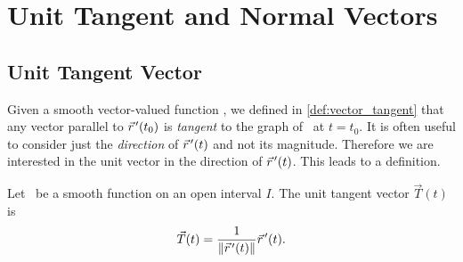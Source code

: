 \section{Unit Tangent and Normal Vectors}\label{sec:tan_norm}

\subsection{Unit Tangent Vector}

Given a smooth vector-valued function \vrt, we defined in \autoref{def:vector_tangent} that any vector parallel to $\vec r\hskip1.25pt '(t_0)$ is \emph{tangent} to the graph of \vrt\ at $t=t_0$. It is often useful to consider just the \emph{direction} of $\vec r\hskip1.25pt '(t)$ and not its magnitude. Therefore we are interested in the unit vector in the direction of $\vec r\hskip1.25pt '(t)$. This leads to a definition.

\begin{definition}\label{def:unit_tangent}%
Let \vrt\ be a smooth function on an open interval $I$. The unit tangent vector $\vec T(t)$ is
 
\[\vec T(t) = \frac1{\left\lVert \vec r\hskip1.25pt '(t) \right\rVert}\vec r\hskip1.25pt '(t).\]
\end{definition}



